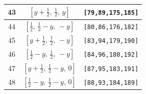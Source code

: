 \documentclass[fleqn,8pt]{jsarticle}
\begin{document}
\begin{longtable}{ccc}
43 & $\left[ y + \frac{1}{2},\, \frac{1}{2},\, y \right]$ & {\tt [79,89,175,185]} \\ \hline
44 & $\left[ \frac{1}{2},\, \frac{1}{2} - y,\, - y \right]$ & {\tt [80,86,176,182]} \\ \hline
45 & $\left[ y + \frac{1}{2},\, \frac{1}{2},\, - y \right]$ & {\tt [83,94,179,190]} \\ \hline
46 & $\left[ \frac{1}{2} - y,\, \frac{1}{2},\, - y \right]$ & {\tt [84,96,180,192]} \\ \hline
47 & $\left[ y + \frac{1}{2},\, \frac{1}{2} - y,\, 0 \right]$ & {\tt [87,95,183,191]} \\ \hline
48 & $\left[ \frac{1}{2} - y,\, \frac{1}{2} - y,\, 0 \right]$ & {\tt [88,93,184,189]} \\
\end{longtable}
\renewcommand{\arraystretch}{1.2}
\end{document}
